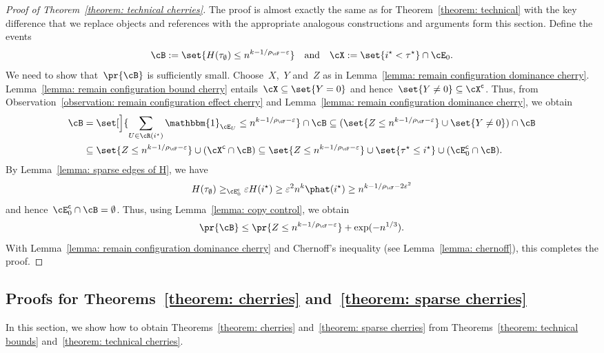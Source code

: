 \documentclass[11pt]{amsart}
\newcommand{\eps}{\varepsilon}
\DeclarePairedDelimiter{\paren}{\lparen}{\rparen}
\newcommand{\ind}{\mathbbm{1}}
\newcommand{\qtand}{\quad\text{and}\quad}
\newcommand{\comp}{{\mathsf{c}}}
\theoremstyle{definition}
\numberwithin{equation}{section}
\begin{document}
	\begin{proof}[Proof of Theorem~\ref{theorem: technical cherries}]
		The proof is almost exactly the same as for Theorem~\ref{theorem: technical} with the key difference that we replace objects and references with the appropriate analogous constructions and arguments form this section.
		Define the events
		\begin{equation*}
			\cB:=\set{ H(\tau_\emptyset)\leq n^{k-1/\rho_\cF-\eps} }\qtand
			\cX:=\set{i^\star <\tau^\star}\cap \cE_0.
		\end{equation*}
		We need to show that~$\pr{\cB}$ is sufficiently small.
		Choose~$X$,~$Y$ and~$Z$ as in Lemma~\ref{lemma: remain configuration dominance cherry}.
		Lemma~\ref{lemma: remain configuration bound cherry} entails~$\cX\subseteq\set{Y=0}$ and hence~$\set{Y\neq 0}\subseteq\cX^\comp$.
		Thus, from Observation~\ref{observation: remain configuration effect cherry} and Lemma~\ref{lemma: remain configuration dominance cherry}, we obtain
		\begin{equation*}
			\begin{aligned}
				\cB
				&=\set[\Big]{ \sum_{U\in\cR(i^\star)} \ind_{\cE_U}\leq n^{k-1/\rho_\cF-\eps} }\cap\cB
				\subseteq \paren{ \set{ Z\leq n^{k-1/\rho_\cF-\eps} }\cup \set{Y\neq 0} }\cap\cB\\
				&\subseteq \set{ Z\leq n^{k-1/\rho_\cF-\eps} } \cup (\cX^\comp\cap \cB)
				\subseteq \set{ Z\leq n^{k-1/\rho_\cF-\eps} } \cup \set{\tau^\star\leq i^\star}\cup (\cE_0^\comp\cap \cB).
			\end{aligned}
		\end{equation*}
		By Lemma~\ref{lemma: sparse edges of H}, we have
		\begin{equation*}
			H(\tau_\emptyset)
			\geq_{\cE_0^\comp} \eps H(i^\star)
			\geq \eps^2 n^k\phat(i^\star)
			\geq n^{k-1/\rho_\cF-2\eps^2}
		\end{equation*}
		and hence~$\cE_0^\comp\cap\cB=\emptyset$.
		Thus, using Lemma~\ref{lemma: copy control}, we obtain
		\begin{equation*}
			\pr{\cB}
			\leq \pr{Z\leq n^{k-1/\rho_\cF-\eps}}+\exp(-n^{1/3}).
		\end{equation*}
		With Lemma~\ref{lemma: remain configuration dominance cherry} and Chernoff's inequality (see Lemma~\ref{lemma: chernoff}), this completes the proof.
	\end{proof}

	\subsection{Proofs for Theorems~\ref{theorem: cherries} and~\ref{theorem: sparse cherries}}
	In this section, we show how to obtain Theorems~\ref{theorem: cherries} and~\ref{theorem: sparse cherries} from Theorems~\ref{theorem: technical bounds} and~\ref{theorem: technical cherries}.
\end{document}
